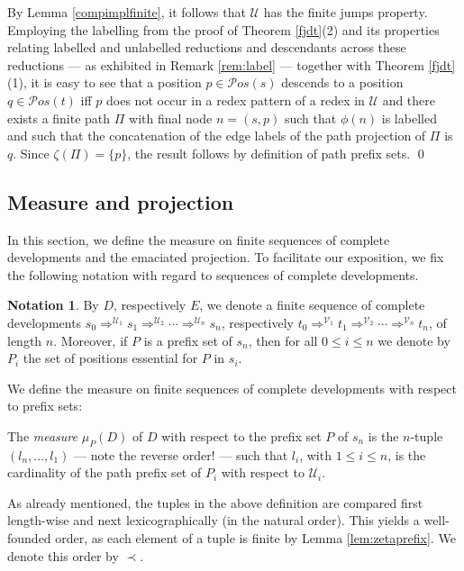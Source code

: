 \documentclass{LMCS}
\theoremstyle{definition}
\newtheorem{notation}[thm]{Notation}
\newcommand{\pos}[1]{\mathcal{P}os(#1)}
\newcommand{\apath}{\Pi}
\newcommand{\dev}{\Rightarrow}
\newcommand{\pme}{\mu}
\newcommand{\pmep}[2]{\pme_{#1}({#2})}
\newcommand{\fscd}[3]{{#1}_0 \dev^{\mathcal{#2}_1} {#1}_1 \dev^{\mathcal{#2}_2} \cdots \dev^{\mathcal{#2}_{#3}} {#1}_{#3}}
\begin{document}
\proof
By Lemma \ref{compimplfinite}, it follows that $\mathcal{U}$ has the finite jumps property. Employing the labelling from the proof of Theorem \ref{fjdt}(2) and its properties relating labelled and unlabelled reductions and descendants across these reductions --- as exhibited in Remark \ref{rem:label} --- together with Theorem \ref{fjdt}(1), it is easy to see that a position $p \in \pos{s}$ descends to a position $q \in \pos{t}$ if{f} $p$ does not occur in a redex pattern of a redex in $\mathcal{U}$ and there exists a finite path $\apath$ with final node $n = (s, p)$ such that $\phi(n)$ is labelled and such that the concatenation of the edge labels of the path projection of $\apath$ is $q$. Since $\zeta(\apath) = \{ p \}$, the result follows by definition of path prefix sets.
\qed

\subsection{Measure and projection}
\label{sec:mes_pro}

In this section, we define the measure on finite sequences of complete developments and the emaciated projection. To facilitate our exposition, we fix the following notation with regard to sequences of complete developments.

\begin{notation}
By $D$, respectively $E$, we denote a finite sequence of complete developments $\fscd{s}{U}{n}$, respectively $\fscd{t}{V}{n}$, of length $n$. Moreover, if $P$ is a prefix set of $s_n$, then for all $0 \leq i \leq n$ we denote by $P_i$ the set of positions essential for $P$ in $s_i$.
\end{notation}

We define the measure on finite sequences of complete developments with respect to prefix sets:
\begin{defi}
\label{measuredef}
The \emph{measure} $\pmep{P}{D}$ of $D$ with respect to the prefix set $P$ of $s_n$ is the $n$-tuple $(l_n,\ldots,l_1)$ --- note the reverse order! --- such that $l_i$, with $1 \leq i \leq n$, is the cardinality of the path prefix set of $P_i$ with respect to $\mathcal{U}_i$.
\end{defi}
As already mentioned, the tuples in the above definition are compared first length-wise and next lexicographically (in the natural order). This yields a well-founded order, as each element of a tuple is finite by Lemma \ref{lem:zetaprefix}. We denote this order by $\prec$.
\end{document}
